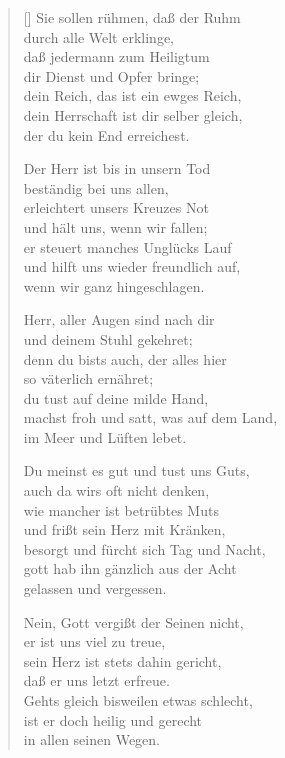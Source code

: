 \begin{multicols}{2}
\begin{verse}[\versewidth]
 Sie sollen rühmen, daß der Ruhm\\
durch alle Welt erklinge,\\
daß jedermann zum Heiligtum\\
dir Dienst und Opfer bringe;\\
dein Reich, das ist ein ewges Reich,\\
dein Herrschaft ist dir selber gleich,\\
der du kein End erreichest.

 Der Herr ist bis in unsern Tod\\
beständig bei uns allen,\\
erleichtert unsers Kreuzes Not\\
und hält uns, wenn wir fallen;\\
er steuert manches Unglücks Lauf\\
und hilft uns wieder freundlich auf,\\
wenn wir ganz hingeschlagen.

 Herr, aller Augen sind nach dir\\
und deinem Stuhl gekehret;\\
denn du bists auch, der alles hier\\
so väterlich ernähret;\\
du tust auf deine milde Hand,\\
machst froh und satt, was auf dem Land,\\
im Meer und Lüften lebet.

 Du meinst es gut und tust uns Guts,\\
auch da wirs oft nicht denken,\\
wie mancher ist betrübtes Muts\\
und frißt sein Herz mit Kränken,\\
besorgt und fürcht sich Tag und Nacht,\\
gott hab ihn gänzlich aus der Acht\\
gelassen und vergessen.

 Nein, Gott vergißt der Seinen nicht,\\
er ist uns viel zu treue,\\
sein Herz ist stets dahin gericht,\\
daß er uns letzt erfreue.\\
Gehts gleich bisweilen etwas schlecht,\\
ist er doch heilig und gerecht\\
in allen seinen Wegen.


\end{verse}
\end{multicols}
